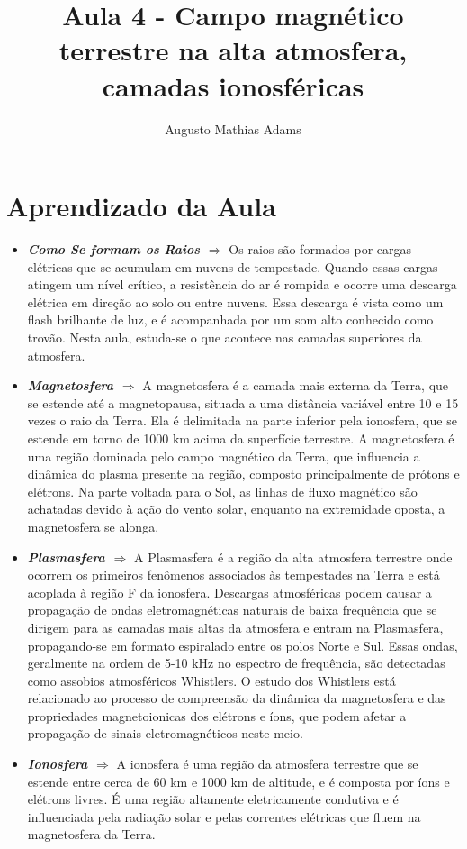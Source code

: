 \documentclass[a4paper, 12pt, onecolumn,singlespacing]{article}
\title{Aula 4 - Campo magnético terrestre na alta atmosfera, camadas ionosféricas}
\author[1]{Augusto Mathias Adams}
\affil[1]{augusto.adams@ufpr.br}
\begin{document}
	
	\maketitle
	
	\section{Aprendizado da Aula}
	
	\begin{itemize}
		\item \textbf{\textit{Como Se formam os Raios $\Rightarrow$ }} Os raios são formados por cargas elétricas que se acumulam em nuvens de tempestade. Quando essas cargas atingem um nível crítico, a resistência do ar é rompida e ocorre uma descarga elétrica em direção ao solo ou entre nuvens. Essa descarga é vista como um flash brilhante de luz, e é acompanhada por um som alto conhecido como trovão. Nesta aula, estuda-se o que acontece nas camadas superiores da atmosfera.
		\item \textbf{\textit{Magnetosfera $\Rightarrow$ }}A magnetosfera é a camada mais externa da Terra, que se estende até a magnetopausa, situada a uma distância variável entre 10 e 15 vezes o raio da Terra. Ela é delimitada na parte inferior pela ionosfera, que se estende em torno de 1000 km acima da superfície terrestre. A magnetosfera é uma região dominada pelo campo magnético da Terra, que influencia a dinâmica do plasma presente na região, composto principalmente de prótons e elétrons. Na parte voltada para o Sol, as linhas de fluxo magnético são achatadas devido à ação do vento solar, enquanto na extremidade oposta, a magnetosfera se alonga.
		\item \textbf{\textit{Plasmasfera $\Rightarrow$ }} A Plasmasfera é a região da alta atmosfera terrestre onde ocorrem os primeiros fenômenos associados às tempestades na Terra e está acoplada à região F da ionosfera. Descargas atmosféricas podem causar a propagação de ondas eletromagnéticas naturais de baixa frequência que se dirigem para as camadas mais altas da atmosfera e entram na Plasmasfera, propagando-se em formato espiralado entre os polos Norte e Sul. Essas ondas, geralmente na ordem de 5-10 kHz no espectro de frequência, são detectadas como assobios atmosféricos Whistlers. O estudo dos Whistlers está relacionado ao processo de compreensão da dinâmica da magnetosfera e das propriedades magnetoionicas dos elétrons e íons, que podem afetar a propagação de sinais eletromagnéticos neste meio.
		\item \textbf{\textit{Ionosfera $\Rightarrow$ }}A ionosfera é uma região da atmosfera terrestre que se estende entre cerca de 60 km e 1000 km de altitude, e é composta por íons e elétrons livres. É uma região altamente eletricamente condutiva e é influenciada pela radiação solar e pelas correntes elétricas que fluem na magnetosfera da Terra.
		

\end{itemize}
\end{document}
